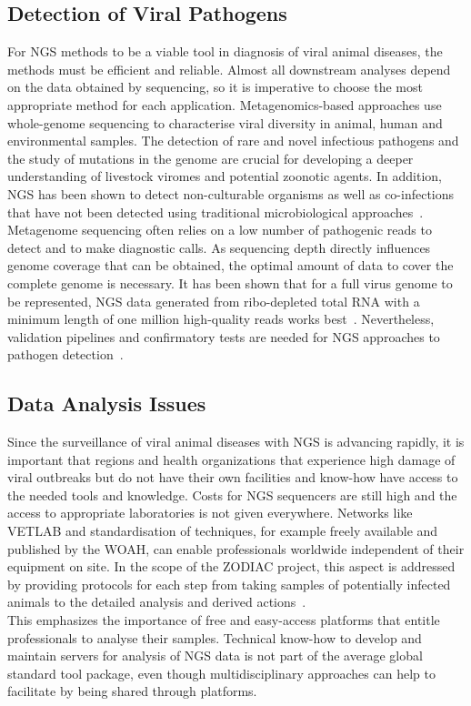 \subsection{Detection of Viral Pathogens}
For NGS methods to be a viable tool in diagnosis of viral animal diseases, the methods must be efficient and reliable. Almost all downstream analyses depend on the data obtained by sequencing, so it is imperative to choose the most appropriate method for each application. Metagenomics-based approaches use whole-genome sequencing to characterise viral diversity in animal, human and environmental samples. The detection of rare and novel infectious pathogens and the study of mutations in the genome are crucial for developing a deeper understanding of livestock viromes and potential zoonotic agents. In addition, NGS has been shown to detect non-culturable organisms as well as co-infections that have not been detected using traditional microbiological approaches~\cite{cantalupo2019detecting}. Metagenome sequencing often relies on a low number of pathogenic reads to detect and to make diagnostic calls. As sequencing depth directly influences genome coverage that can be obtained, the optimal amount of data to cover the complete genome is necessary. It has been shown that for a full virus genome to be represented, NGS data generated from ribo-depleted total RNA with a minimum length of one million high-quality reads works best~\cite{visser2016next}. Nevertheless, validation pipelines and confirmatory tests are needed for NGS approaches to pathogen detection~\cite{minogue2019next}.


\subsection{Data Analysis Issues}
Since the surveillance of viral animal diseases with NGS is advancing rapidly, it is important that regions and health organizations that experience high damage of viral outbreaks but do not have their own facilities and know-how have access to the needed tools and knowledge. Costs for NGS sequencers are still high and the access to appropriate laboratories is not given everywhere. Networks like VETLAB and standardisation of techniques, for example freely available and published by the WOAH, can enable professionals worldwide independent of their equipment on site. In the scope of the ZODIAC project, this aspect is addressed by providing protocols for each step from taking samples of potentially infected animals to the detailed analysis and derived actions~\cite{zodiac2021}.\\
This emphasizes the importance of free and easy-access platforms that entitle professionals to analyse their samples. Technical know-how to develop and maintain servers for analysis of NGS data is not part of the average global standard tool package, even though multidisciplinary approaches can help to facilitate by being shared through platforms.

